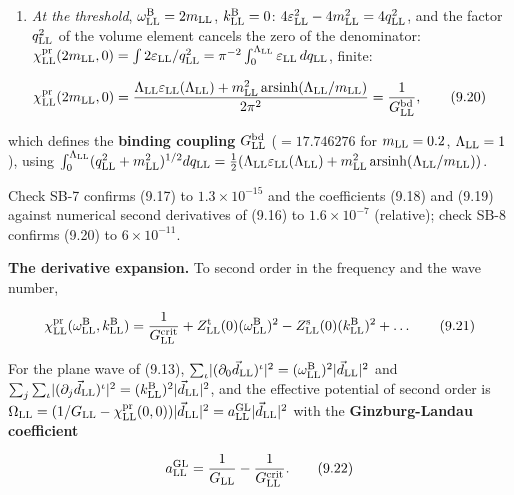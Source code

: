 \documentclass[
  10pt,
]{article}
\providecommand{\tightlist}{%
  \setlength{\itemsep}{0pt}\setlength{\parskip}{0pt}}
\begin{document}
\begin{enumerate}
\def\labelenumi{(\roman{enumi})}
\setcounter{enumi}{3}
\tightlist
\item
  \emph{At the threshold}, \(\omega^{\rm B}_{\rm LL}=2m_{\rm LL}\),
  \(k^{\rm B}_{\rm LL}=0\):
  \(4\varepsilon_{\rm LL}^2-4m_{\rm LL}^2=4q_{\rm LL}^2\), and the
  factor \(q_{\rm LL}^2\) of the volume element cancels the zero of the
  denominator:
  \(\chi^{\rm pr}_{\rm LL}(2m_{\rm LL},0)=\int2\varepsilon_{\rm LL}/q_{\rm LL}^2=\pi^{-2}\int_0^{\Lambda_{\rm LL}}\varepsilon_{\rm LL}\,dq_{\rm LL}\),
  finite:
\end{enumerate}

\[\chi^{\rm pr}_{\rm LL}(2m_{\rm LL},0)=\frac{\Lambda_{\rm LL}\varepsilon_{\rm LL}(\Lambda_{\rm LL})+m_{\rm LL}^2\,\mathrm{arsinh}(\Lambda_{\rm LL}/m_{\rm LL})}{2\pi^2}=\frac1{G^{\rm bd}_{\rm LL}},\tag{9.20}\]

which defines the \textbf{binding coupling} \(G^{\rm bd}_{\rm LL}\)
(\(=17.746276\) for \(m_{\rm LL}=0.2\), \(\Lambda_{\rm LL}=1\)), using
\(\int_0^{\Lambda_{\rm LL}}(q_{\rm LL}^2+m_{\rm LL}^2)^{1/2}dq_{\rm LL}=\tfrac12(\Lambda_{\rm LL}\varepsilon_{\rm LL}(\Lambda_{\rm LL})+m_{\rm LL}^2\,\mathrm{arsinh}(\Lambda_{\rm LL}/m_{\rm LL}))\).

Check SB-7 confirms (9.17) to \(1.3\times10^{-15}\) and the coefficients
(9.18) and (9.19) against numerical second derivatives of (9.16) to
\(1.6\times10^{-7}\) (relative); check SB-8 confirms (9.20) to
\(6\times10^{-11}\).

\textbf{The derivative expansion.} To second order in the frequency and
the wave number,

\[\chi^{\rm pr}_{\rm LL}(\omega^{\rm B}_{\rm LL},k^{\rm B}_{\rm LL})=\frac1{G^{\rm crit}_{\rm LL}}+Z^{\rm t}_{\rm LL}(0)(\omega^{\rm B}_{\rm LL})^2-Z^{\rm s}_{\rm LL}(0)(k^{\rm B}_{\rm LL})^2+\dots\tag{9.21}\]

For the plane wave of (9.13),
\(\sum_\iota\lvert(\partial_0\vec d_{\rm LL})^\iota\rvert^2=(\omega^{\rm B}_{\rm LL})^2\lvert\vec d_{\rm LL}\rvert^2\)
and
\(\sum_j\sum_\iota\lvert(\partial_j\vec d_{\rm LL})^\iota\rvert^2=(k^{\rm B}_{\rm LL})^2\lvert\vec d_{\rm LL}\rvert^2\),
and the effective potential of second order is
\(\Omega_{\rm LL}=(1/G_{\rm LL}-\chi^{\rm pr}_{\rm LL}(0,0))\lvert\vec d_{\rm LL}\rvert^2=a^{\rm GL}_{\rm LL}\lvert\vec d_{\rm LL}\rvert^2\)
with the \textbf{Ginzburg-Landau coefficient}

\[a^{\rm GL}_{\rm LL}=\frac1{G_{\rm LL}}-\frac1{G^{\rm crit}_{\rm LL}}.\tag{9.22}\]
\end{document}
